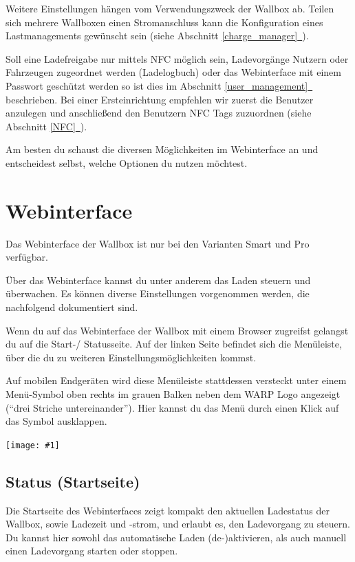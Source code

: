 \documentclass[a4paper,10pt]{article}
\newcommand{\gfx}[1]{\texttt{[image: \#1]}}
\newcommand*{\fullref}[1]{Abschnitt \hyperref[{#1}]{\ref*{#1}~\nameref*{#1}}}
\begin{document}
\begin{multicols*}{2}
    Weitere Einstellungen hängen vom Verwendungszweck der Wallbox ab. Teilen
    sich mehrere Wallboxen einen Stromanschluss kann die Konfiguration eines
    Lastmanagements gewünscht sein (siehe \fullref{charge_manager}).

    Soll eine Ladefreigabe
    nur mittels NFC möglich sein, Ladevorgänge Nutzern oder Fahrzeugen
    zugeordnet werden (Ladelogbuch) oder das Webinterface mit einem Passwort
    geschützt werden so ist dies im \fullref{user_management} beschrieben.
    Bei einer Ersteinrichtung empfehlen wir zuerst die Benutzer anzulegen und
    anschließend den Benutzern NFC Tags zuzuordnen (siehe \fullref{NFC}).

    Am besten du schaust die diversen Möglichkeiten im Webinterface an und
    entscheidest selbst, welche Optionen du nutzen möchtest.

    \section{Webinterface}\label{webinterface}
    Das Webinterface der Wallbox ist nur bei den Varianten Smart und Pro verfügbar.

    Über das Webinterface kannst du unter anderem das Laden steuern und überwachen.
    Es können diverse Einstellungen vorgenommen werden, die nachfolgend
    dokumentiert sind.

    Wenn du auf das Webinterface der Wallbox mit einem Browser zugreifst
    gelangst du auf die Start-/ Statusseite. Auf der linken Seite befindet sich
    die Menüleiste, über die du zu weiteren Einstellungsmöglichkeiten kommst.

    Auf mobilen Endgeräten wird
    diese Menüleiste stattdessen versteckt unter einem Menü-Symbol oben rechts
    im grauen Balken neben dem WARP Logo angezeigt (\enquote{drei Striche untereinander}).
    Hier kannst du das Menü durch einen Klick auf das Symbol ausklappen.

    \gfx{./img_warp2/resized/web_status}

    \subsection{Status (Startseite)}

    Die Startseite des Webinterfaces zeigt kompakt den aktuellen Ladestatus der
    Wallbox, sowie Ladezeit und -strom, und erlaubt es, den Ladevorgang zu steuern.
    Du kannst hier sowohl das automatische Laden (de-)aktivieren, als auch
    manuell einen Ladevorgang starten oder stoppen.


\end{multicols*}
\end{document}
